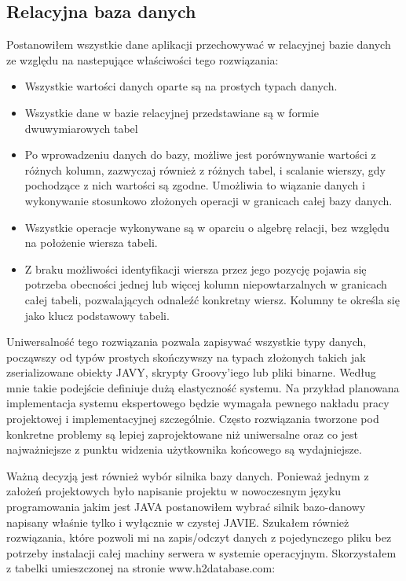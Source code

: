 \subsection{Relacyjna baza danych}
\label{sec:relacyjnaBazaDanych}

Postanowiłem wszystkie dane aplikacji przechowywać w relacyjnej bazie danych ze względu na nastepujące właściwości tego rozwiązania:
\begin{itemize}
 \item Wszystkie wartości danych oparte są na prostych typach danych.
 \item Wszystkie dane w bazie relacyjnej przedstawiane są w formie dwuwymiarowych tabel
 \item Po wprowadzeniu danych do bazy, możliwe jest porównywanie wartości z różnych kolumn, zazwyczaj również z różnych tabel, i scalanie wierszy, gdy pochodzące z nich wartości są zgodne. Umożliwia to wiązanie danych i wykonywanie stosunkowo złożonych operacji w granicach całej bazy danych.
 \item Wszystkie operacje wykonywane są w oparciu o algebrę relacji, bez względu na położenie wiersza tabeli.
 \item Z braku możliwości identyfikacji wiersza przez jego pozycję pojawia się potrzeba obecności jednej lub więcej kolumn niepowtarzalnych w granicach całej tabeli, pozwalających odnaleźć konkretny wiersz. Kolumny te określa się jako klucz podstawowy tabeli.
\end{itemize}
Uniwersalność tego rozwiązania pozwala zapisywać wszystkie typy danych, począwszy od typów prostych skończywszy na typach złożonych takich jak zserializowane obiekty JAVY, skrypty Groovy'iego lub pliki binarne. Według mnie takie podejście definiuje dużą elastyczność systemu. Na przykład planowana implementacja systemu ekspertowego będzie wymagała pewnego nakładu pracy projektowej i implementacyjnej szczególnie. Często rozwiązania tworzone pod konkretne problemy są lepiej zaprojektowane niż uniwersalne oraz co jest najważniejsze z punktu widzenia użytkownika końcowego są wydajniejsze.

Ważną decyzją jest również wybór silnika bazy danych. Ponieważ jednym z założeń projektowych było napisanie projektu w nowoczesnym języku programowania jakim jest JAVA postanowiłem wybrać silnik bazo-danowy napisany właśnie tylko i wyłącznie w czystej JAVIE. Szukałem również rozwiązania, które pozwoli mi na zapis/odczyt danych z pojedynczego pliku bez potrzeby instalacji całej machiny serwera w systemie operacyjnym. Skorzystałem z tabelki umieszczonej na stronie www.h2database.com:

